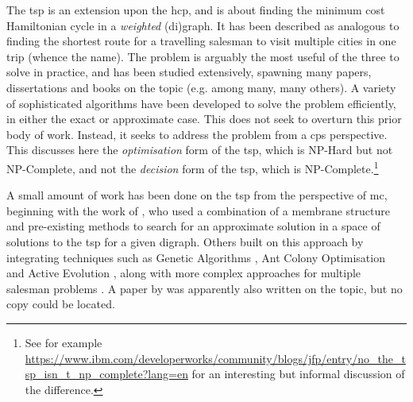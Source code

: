 The \gls{tsp} is an extension upon the \gls{hcp}, and is about finding the minimum cost Hamiltonian cycle in a \emph{weighted} (di)graph.  It has been described as analogous to finding the shortest route for a travelling salesman to visit multiple cities in one trip (whence the name).  The problem is arguably the most useful of the three to solve in practice, and has been studied extensively, spawning many papers, dissertations and books on the topic (e.g. \cite{Smith2017,Ezugwu2017,Cook2012,Applegate2006} among many, many others).  A variety of sophisticated algorithms have been developed to solve the problem efficiently, in either the exact or approximate case.  This  does not seek to overturn this prior body of work.  Instead, it seeks to address the problem from a \gls{cps} perspective.  This  discusses here the \emph{optimisation} form of the \gls{tsp}, which is NP-Hard but not NP-Complete, and not the \emph{decision} form of the \gls{tsp}, which is NP-Complete.\footnote{See for example \url{https://www.ibm.com/developerworks/community/blogs/jfp/entry/no_the_tsp_isn_t_np_complete?lang=en} for an interesting but informal discussion of the difference.}


A small amount of work has been done on the \gls{tsp} from the perspective of \gls{mc}, beginning with the work of \citeauthor{Nishida2006} \cite{Nishida2006}, who used a combination of a membrane structure and pre-existing methods to search for an approximate solution in a space of solutions to the \gls{tsp} for a given digraph.  Others built on this approach by integrating techniques such as Genetic Algorithms \cite{Manalastas2013,He2014}, Ant Colony Optimisation \cite{Zhang2011} and Active Evolution \cite{Song2015}, along with more complex approaches for multiple salesman problems \cite{He2015}.  A paper by \citeauthor{Chen2011} \cite{Chen2011} was apparently also written on the topic, but no copy could be located.

